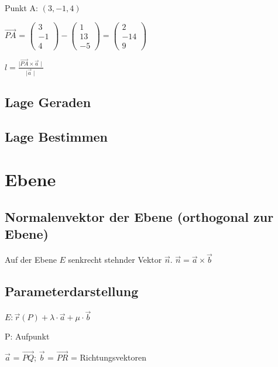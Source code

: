 \begin{multicols*}{3}
    {Punkt A: $(3,-1,4)$}

    {$\overrightarrow{PA}$ = $\begin{pmatrix}
                3  \\
                -1 \\
                4
            \end{pmatrix} -  \begin{pmatrix}
                1  \\
                13 \\
                -5
            \end{pmatrix} =
            \begin{pmatrix}
                2   \\
                -14 \\
                9
            \end{pmatrix} $}

    {$l = \frac {\mid \overrightarrow{PA} \times\vec{a}\mid}{\mid\vec{a}\mid} $}

    \subsection{Lage Geraden}

    \subsection{Lage Bestimmen}

    \section{Ebene}

    \subsection{Normalenvektor der Ebene (orthogonal zur Ebene)}
    {Auf der Ebene $ E $ senkrecht stehnder Vektor $\vec{n}$.}
    $\vec{n} = \vec{a} \times \vec{b}$

    \subsection{Parameterdarstellung}

    {\large $ E: \vec{r}(P) + \lambda \cdot \vec{a} + \mu \cdot \vec{b} $}

    {P: Aufpunkt}

    {$ \vec{a}$ = $\overrightarrow{PQ} $; $ \vec{b}$ = $\overrightarrow{PR} $ = Richtungsvektoren}




\end{multicols*}

